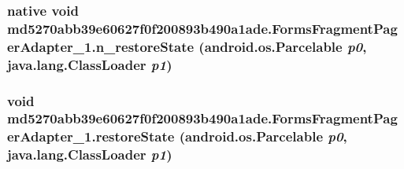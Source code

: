 \hypertarget{classmd5270abb39e60627f0f200893b490a1ade_1_1_forms_fragment_pager_adapter__1_dbf99747b00bb31865eab9b5717bbc0b}{
\subsubsection[{n\_\-restoreState}]{\setlength{\rightskip}{0pt plus 5cm}native void md5270abb39e60627f0f200893b490a1ade.FormsFragmentPagerAdapter\_\-1.n\_\-restoreState (android.os.Parcelable {\em p0}, \/  java.lang.ClassLoader {\em p1})}}
\label{classmd5270abb39e60627f0f200893b490a1ade_1_1_forms_fragment_pager_adapter__1_dbf99747b00bb31865eab9b5717bbc0b}


\hypertarget{classmd5270abb39e60627f0f200893b490a1ade_1_1_forms_fragment_pager_adapter__1_1ca53f9ddc8aa628e82b453c1eecc15c}{
\subsubsection[{restoreState}]{\setlength{\rightskip}{0pt plus 5cm}void md5270abb39e60627f0f200893b490a1ade.FormsFragmentPagerAdapter\_\-1.restoreState (android.os.Parcelable {\em p0}, \/  java.lang.ClassLoader {\em p1})}}
\label{classmd5270abb39e60627f0f200893b490a1ade_1_1_forms_fragment_pager_adapter__1_1ca53f9ddc8aa628e82b453c1eecc15c}





